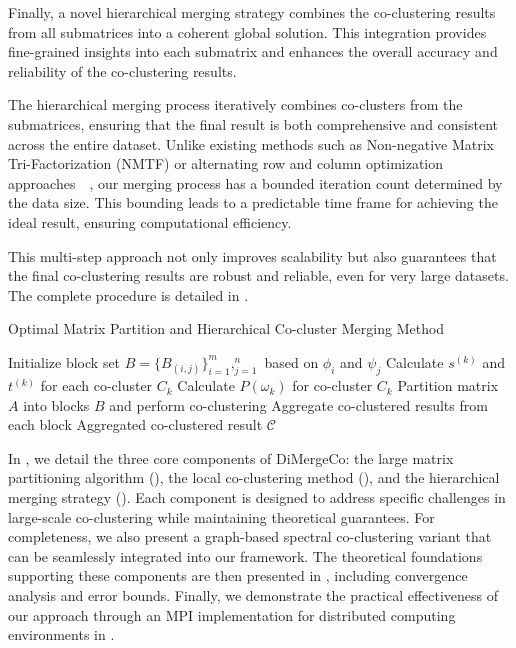 \documentclass[journal]{IEEEtran}
\renewcommand{\cite}[1]{~\autocite{#1}}
\begin{document}
Finally, a novel hierarchical merging strategy combines the co-clustering results from all submatrices into a coherent global solution. This integration provides fine-grained insights into each submatrix and enhances the overall accuracy and reliability of the co-clustering results.

The hierarchical merging process iteratively combines co-clusters from the submatrices, ensuring that the final result is both comprehensive and consistent across the entire dataset. Unlike existing methods such as Non-negative Matrix Tri-Factorization (NMTF) or alternating row and column optimization approaches~\cite{wang2011FastNonnegativeMatrix}, our merging process has a bounded iteration count determined by the data size. This bounding leads to a predictable time frame for achieving the ideal result, ensuring computational efficiency.

This multi-step approach not only improves scalability but also guarantees that the final co-clustering results are robust and reliable, even for very large datasets. The complete procedure is detailed in .

\begin{algorithm}[!t]
    \caption{Optimal Matrix Partition and Hierarchical Co-cluster Merging Method}\label{alg:method}
    \begin{algorithmic}[1]
        \STATE Initialize block set $B = \{B_{(i,j)}\}_{i=1}^m,_{j=1}^n$ based on $\phi_i$ and $\psi_j$
        \STATE Calculate $s^{(k)}$ and $t^{(k)}$ for each co-cluster $C_k$
        \STATE Calculate $P(\omega_k)$ for co-cluster $C_k$
        \STATE Partition matrix $A$ into blocks $B$ and perform co-clustering
        \STATE Aggregate co-clustered results from each block
        \ENDIF
        \ENDFOR
        \RETURN Aggregated co-clustered result $\mathcal{C}$
    \end{algorithmic}
\end{algorithm}

In , we detail the three core components of DiMergeCo: the large matrix partitioning algorithm (), the local co-clustering method (), and the hierarchical merging strategy (). Each component is designed to address specific challenges in large-scale co-clustering while maintaining theoretical guarantees. For completeness, we also present a graph-based spectral co-clustering variant that can be seamlessly integrated into our framework. The theoretical foundations supporting these components are then presented in , including convergence analysis and error bounds. Finally, we demonstrate the practical effectiveness of our approach through an MPI implementation for distributed computing environments in .
\end{document}
